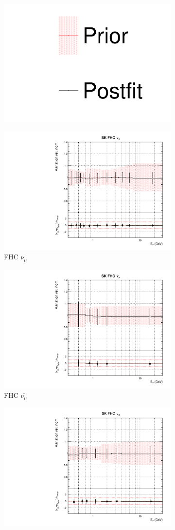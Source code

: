 \begin{figure}[!htbp]
\centering
\begin{subfigure}{0.8\textwidth}
  \centering
  \includegraphics[width=0.24\linewidth]{figs/asmv_leg}
\end{subfigure}
\begin{subfigure}{0.45\textwidth}
  \centering
  \includegraphics[width=0.75\linewidth]{figs/asmvfluxpoly8}
  \caption{\SK FHC $\nu_{\mu}$}
\end{subfigure}
\begin{subfigure}{0.45\textwidth}
  \centering
  \includegraphics[width=0.75\linewidth]{figs/asmvfluxpoly9}
  \caption{\SK FHC $\bar{\nu_{\mu}}$}
\end{subfigure}
\begin{subfigure}{0.45\textwidth}
  \centering
  \includegraphics[width=0.75\linewidth]{figs/asmvfluxpoly10}

\end{subfigure}
\end{figure}
